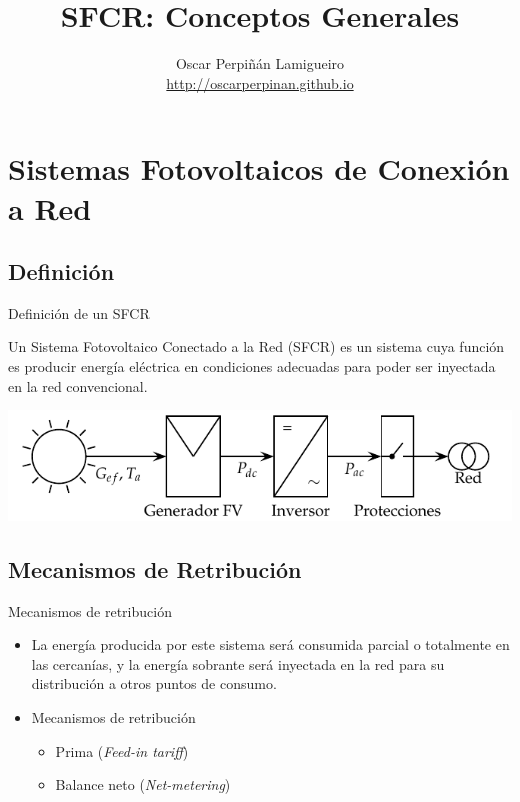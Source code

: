\documentclass[xcolor={usenames,svgnames,dvipsnames}]{beamer}
\author{Oscar Perpiñán Lamigueiro \\ \url{http://oscarperpinan.github.io}}
\date{}
\title{SFCR: Conceptos Generales}
\begin{document}
\maketitle

\section{Sistemas Fotovoltaicos de Conexión a Red}
\label{sec-1}

\subsection{Definición}
\label{sec-1-1}

\begin{frame}[label=sec-1-1-1]{Definición de un SFCR}
\begin{exampleblock}{}
Un Sistema Fotovoltaico Conectado a la Red (SFCR) es un sistema cuya
función es producir energía eléctrica en condiciones adecuadas para
poder ser inyectada en la red convencional.

\includegraphics[width=.9\linewidth]{../figs/EsquemaSFCR.pdf}
\end{exampleblock}
\end{frame}

\subsection{Mecanismos de Retribución}
\label{sec-1-2}
\begin{frame}[label=sec-1-2-1]{Mecanismos de retribución}
\begin{itemize}
\item La energía producida por este sistema será consumida parcial o totalmente en las cercanías, y la energía sobrante será inyectada en la red para su distribución a otros puntos de consumo.

\item Mecanismos de retribución

\begin{itemize}
\item Prima (\emph{Feed-in tariff})

\item Balance neto (\emph{Net-metering})
\end{itemize}
\end{itemize}
\end{frame}
\end{document}
